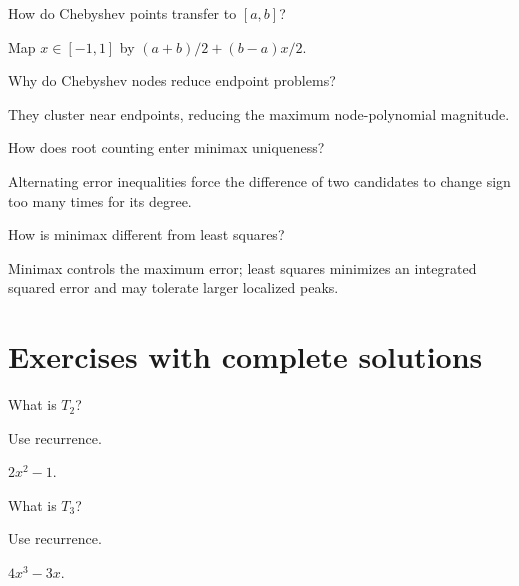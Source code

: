 \begin{problem}\label{prob:ii22-problem-09}
How do Chebyshev points transfer to $[a,b]$?
\end{problem}
\begin{solution}
Map $x\in[-1,1]$ by $(a+b)/2+(b-a)x/2$.
\end{solution}

\begin{problem}\label{prob:ii22-problem-10}
Why do Chebyshev nodes reduce endpoint problems?
\end{problem}
\begin{solution}
They cluster near endpoints, reducing the maximum node-polynomial magnitude.
\end{solution}

\begin{problem}\label{prob:ii22-problem-11}
How does root counting enter minimax uniqueness?
\end{problem}
\begin{solution}
Alternating error inequalities force the difference of two candidates to change sign too many times for its degree.
\end{solution}

\begin{problem}\label{prob:ii22-problem-12}
How is minimax different from least squares?
\end{problem}
\begin{solution}
Minimax controls the maximum error; least squares minimizes an integrated squared error and may tolerate larger localized peaks.
\end{solution}

\section{Exercises with complete solutions}

\begin{exercise}\label{exr:ii22-01}
What is $T_2$?
\end{exercise}
\begin{hint}
Use recurrence.
\end{hint}
\begin{solution}
$2x^2-1$.
\end{solution}

\begin{exercise}\label{exr:ii22-02}
What is $T_3$?
\end{exercise}
\begin{hint}
Use recurrence.
\end{hint}
\begin{solution}
$4x^3-3x$.
\end{solution}


